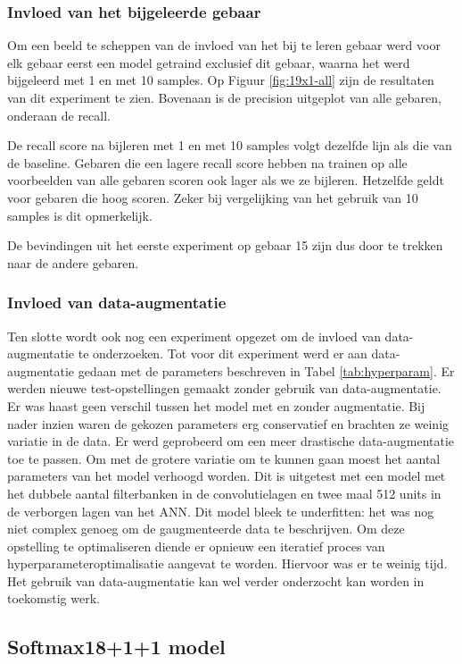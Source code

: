 \subsubsection{Invloed van het bijgeleerde gebaar}

Om een beeld te scheppen van de invloed van het bij te leren gebaar werd voor elk gebaar eerst een model getraind exclusief dit gebaar, waarna het werd bijgeleerd met 1 en met 10 samples. Op Figuur \ref{fig:19x1-all} zijn de resultaten van dit experiment te zien. Bovenaan is de precision uitgeplot van alle gebaren, onderaan de recall.

\npar De recall score na bijleren met 1 en met 10 samples volgt dezelfde lijn als die van de baseline. Gebaren die een lagere recall score hebben na trainen op alle voorbeelden van alle gebaren scoren ook lager als we ze bijleren. Hetzelfde geldt voor gebaren die hoog scoren. Zeker bij vergelijking van het gebruik van 10 samples is dit opmerkelijk.

\npar De bevindingen uit het eerste experiment op gebaar 15 zijn dus door te trekken naar de andere gebaren.

\subsubsection{Invloed van data-augmentatie}
Ten slotte wordt ook nog een experiment opgezet om de invloed van data-augmentatie te onderzoeken. Tot voor dit experiment werd er aan data-augmentatie gedaan met de parameters beschreven in Tabel \ref{tab:hyperparam}. Er werden nieuwe test-opstellingen gemaakt zonder gebruik van data-augmentatie. Er was haast geen verschil tussen het model met en zonder augmentatie. Bij nader inzien waren de gekozen parameters erg conservatief en brachten ze weinig variatie in de data. Er werd geprobeerd om een meer drastische data-augmentatie toe te passen. Om met de grotere variatie om te kunnen gaan moest het aantal parameters van het model verhoogd worden. Dit is uitgetest met een model met het dubbele aantal filterbanken in de convolutielagen en twee maal 512 units in de verborgen lagen van het ANN. Dit model bleek te underfitten: het was nog niet complex genoeg om de gaugmenteerde data te beschrijven. Om deze opstelling te optimaliseren diende er opnieuw een iteratief proces van hyperparameteroptimalisatie aangevat te worden. Hiervoor was er te weinig tijd. Het gebruik van data-augmentatie kan wel verder onderzocht kan worden in toekomstig werk.

\subsection{Softmax18+1+1 model}


